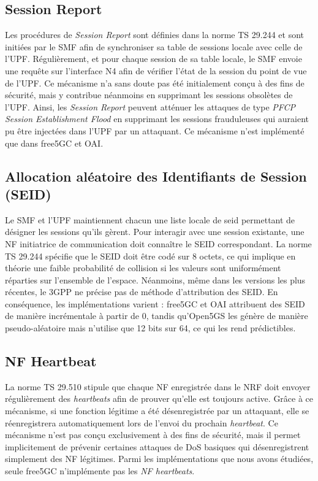 \documentclass[a4paper,11pt,twoside]{StyleThese}
\begin{document}
\subsection{Session Report}
Les procédures de \textit{Session Report} sont définies dans la norme TS 29.244\cite{ts_29244} et sont initiées par le SMF afin de synchroniser sa table de sessions locale avec celle de l'UPF. Régulièrement, et pour chaque session de sa table locale, le SMF envoie une requête sur l’interface N4 afin de vérifier l’état de la session du point de vue de l'UPF. 
%
Ce mécanisme n’a sans doute pas été initialement conçu à des fins de sécurité, mais y contribue néanmoins en supprimant les sessions obsolètes de l'UPF. Ainsi, les \textit{Session Report} peuvent atténuer les attaques de type \textit{PFCP Session Establishment Flood} en supprimant les sessions frauduleuses qui auraient pu être injectées dans l'UPF par un attaquant. Ce mécanisme n’est implémenté que dans free5GC et OAI.

\subsection{Allocation aléatoire des Identifiants de Session (SEID)}
Le SMF et l'UPF maintiennent chacun une liste locale de \gls{seid} permettant de désigner les sessions qu’ils gèrent. Pour interagir avec une session existante, une NF initiatrice de communication doit connaître le SEID correspondant. La norme TS 29.244\cite{ts_29244} spécifie que le SEID doit être codé sur 8 octets, ce qui implique en théorie une faible probabilité de collision si les valeurs sont uniformément réparties sur l’ensemble de l’espace. 
%
Néanmoins, même dans les versions les plus récentes, le 3GPP ne précise pas de méthode d’attribution des SEID. En conséquence, les implémentations varient : free5GC et OAI attribuent des SEID de manière incrémentale à partir de 0, tandis qu’Open5GS les génère de manière pseudo-aléatoire mais n’utilise que 12 bits sur 64, ce qui les rend prédictibles.

\subsection{NF Heartbeat}
La norme TS 29.510\cite{ts_29510} stipule que chaque NF enregistrée dans le NRF doit envoyer régulièrement des \textit{heartbeats} afin de prouver qu’elle est toujours active. Grâce à ce mécanisme, si une fonction légitime a été désenregistrée par un attaquant, elle se réenregistrera automatiquement lors de l’envoi du prochain \textit{heartbeat}. 
%
Ce mécanisme n’est pas conçu exclusivement à des fins de sécurité, mais il permet implicitement de prévenir certaines attaques de DoS basiques qui désenregistrent simplement des NF légitimes. Parmi les implémentations que nous avons étudiées, seule free5GC n’implémente pas les \textit{NF heartbeats}.
\end{document}
